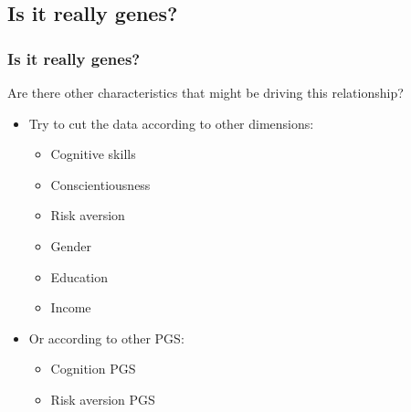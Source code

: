 \documentclass[10pt,compress,xcolor=dvipsnames,aspectratio=169]{beamer}    %
\newcommand{\1}[1]{\mathrm{1\hspace*{-2.5pt}l}[#1]}	%
\begin{document}
\subsection[Split]{Is it really genes?}
\begin{frame} \label{frame:otherX}
\frametitle{Is it really genes?}
Are there other characteristics that might be driving this relationship?

\begin{itemize}
	\item Try to cut the data according to other dimensions:
	\begin{itemize}
		\item Cognitive skills 	\hyperlink{fig:cog}{\beamergotobutton{}}
		\item Conscientiousness \hyperlink{fig:consc}{\beamergotobutton{}}
		\item Risk aversion 	\hyperlink{fig:risk}{\beamergotobutton{}}
		\item Gender 			\hyperlink{fig:gender}{\beamergotobutton{}}
		\item Education 		\hyperlink{fig:edu}{\beamergotobutton{}}
		\item Income 			\hyperlink{fig:income}{\beamergotobutton{}}
	\end{itemize}

	\item Or according to other PGS:
	\begin{itemize}
		\item Cognition PGS 	\hyperlink{fig:cogPGS}{\beamergotobutton{}}
		\item Risk aversion PGS	\hyperlink{fig:riskPGS}{\beamergotobutton{}}
	\end{itemize}
\end{itemize}

\end{frame}
\end{document}
